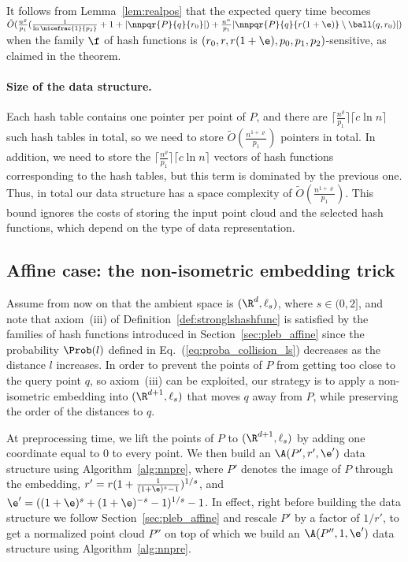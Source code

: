 It follows from Lemma~\ref{lem:realpos} that the expected query time
becomes $\tilde O(\frac{n^\varrho}{p_1}
(\frac{1}{\ln\nicefrac{1}{p_2}}+1+|\nnpqr{P}{q}{r_0}|) +
\frac{n^\alpha}{p_1}|\nnpqr{P}{q}{r(1+\e)}\setminus \ball(q,r_0)|)$ when the
family $\f$ of hash functions is $(r_0, r, r(1+\e), p_0, p_1,
p_2)$-sensitive, as claimed in the theorem.

\paragraph{Size of the data structure.}
Each hash table contains one pointer per point of $P$, and there are
$\lceil \frac{n^\varrho}{p_1}\rceil \lceil c\ln n\rceil$ such hash
tables in total, so we need to store $\tilde
O(\frac{n^{1+\varrho}}{p_1})$ pointers in total. In addition, we need
to store the $\lceil \frac{n^\varrho}{p_1}\rceil \lceil c\ln n\rceil$
vectors of hash functions corresponding to the hash tables, but this
term is dominated by the previous one. Thus, in total our data
structure has a space complexity of $\tilde
O(\frac{n^{1+\varrho}}{p_1})$. This bound ignores the costs of storing
the input point cloud and the selected hash functions, which depend on
the type of data representation.



\subsection{Affine case: the non-isometric embedding trick}
\label{sec:erpleb_Rd}

Assume from now on that the ambient space is $(\R^d,\ell_s)$, where
$s\in (0,2]$, and note that axiom~(iii) of
Definition~\ref{def:stronglshashfunc} is satisfied by the families of
hash functions introduced in Section~\ref{sec:pleb_affine} since the
probability $\Prob(l)$ defined in Eq.~(\ref{eq:proba_collision_ls})
decreases as the distance $l$ increases. In order to prevent the
points of $P$ from getting too close to the query point $q$, so
axiom~(iii) can be exploited, our strategy is to 
apply a non-isometric embedding into $(\R^{d+1}, \ell_s)$ that moves
$q$ away from $P$, while preserving the order of the distances to $q$.

At preprocessing time, we lift the points of $P$ to $(\R^{d+1},
\ell_s)$ by adding one coordinate equal to $0$ to every point. We then
build an $\A(P', r', \e')$ data structure using
Algorithm~\ref{alg:nnpre}, where $P'$ denotes the image of $P$ through
the embedding, $r'=r(1+\frac{1}{(1+\e)^s-1})^{1/s}$, and
$\e'=((1+\e)^s+(1+\e)^{-s}-1)^{1/s}-1$.  In effect, right before
building the data structure we follow
Section~\ref{sec:pleb_affine} and rescale $P'$ by a factor of $1/r'$,
to get a normalized point cloud $P''$ on top of which we build
an $\A(P'', 1, \e')$ data structure using Algorithm~\ref{alg:nnpre}.

